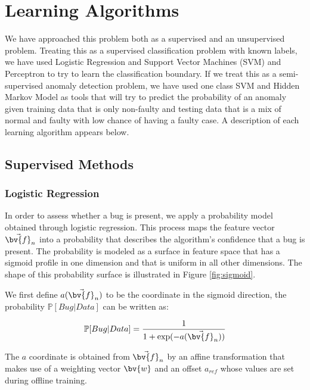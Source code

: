 \section{Learning Algorithms} \label{learningalgos}

We have approached this problem both as a supervised and an
unsupervised problem. Treating this as a supervised classification
problem with known labels, we have used Logistic Regression and
Support Vector Machines (SVM) and Perceptron to try to learn the
classification boundary. If we treat this as a semi-supervised anomaly
detection problem, we have used one class SVM and Hidden Markov Model
as tools that will try to predict the probability of an anomaly given
training data that is only non-faulty and testing data that is a mix
of normal and faulty with low chance of having a faulty case. A
description of each learning algorithm appears below.

\subsection{Supervised Methods}

\subsubsection{Logistic Regression}

In order to assess whether a bug is present, we apply a probability
model obtained through logistic regression. This process maps the
feature vector $\vec{\bv{f}}_n$ into a probability that describes
the algorithm's confidence that a bug is present.  The probability is
modeled as a surface in feature space that has a sigmoid
profile in one dimension and that is uniform in all other
dimensions. The shape of this probability surface is illustrated in
Figure \ref{fig:sigmoid}.

We first define $a(\vec{\bv{f}}_n)$ to be the coordinate in the sigmoid direction,
the probability $\mathbb{P}[Bug | Data]$ can be written as:

\begin{equation}
  \label{e:prob_bug}
  \mathbb{P}[Bug | Data] = \frac{1}{1 + \exp(-a(\vec{\bv{f}}_n))}
\end{equation}

The $a$ coordinate is obtained from $\vec{\bv{f}}_n$ by an affine
transformation that makes use of a weighting vector $\bv{w}$ and an
offset $a_{ref}$ whose values are set during offline training. 

